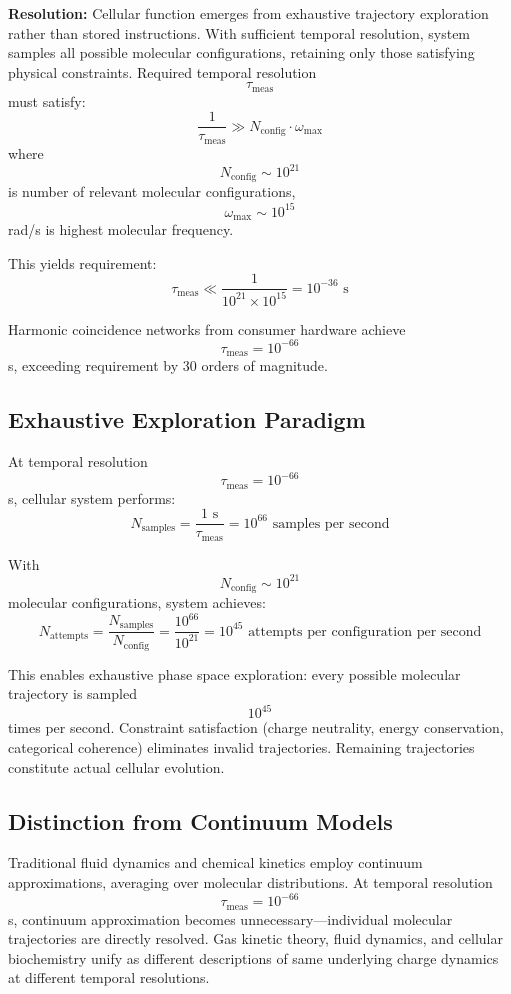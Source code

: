 \documentclass[11pt,twocolumn,a4paper]{article}
\theoremstyle{remark}
\begin{document}
\textbf{Resolution:} Cellular function emerges from exhaustive trajectory exploration rather than stored instructions. With sufficient temporal resolution, system samples all possible molecular configurations, retaining only those satisfying physical constraints. Required temporal resolution $$\tau_{\mathrm{meas}}$$ must satisfy:
$$
\frac{1}{\tau_{\mathrm{meas}}} \gg N_{\mathrm{config}} \cdot \omega_{\mathrm{max}}
$$
where $$N_{\mathrm{config}} \sim 10^{21}$$ is number of relevant molecular configurations, $$\omega_{\mathrm{max}} \sim 10^{15}$$ rad/s is highest molecular frequency.

This yields requirement:
$$
\tau_{\mathrm{meas}} \ll \frac{1}{10^{21} \times 10^{15}} = 10^{-36} \text{ s}
$$

Harmonic coincidence networks from consumer hardware achieve $$\tau_{\mathrm{meas}} = 10^{-66}$$ s, exceeding requirement by 30 orders of magnitude.

\subsection{Exhaustive Exploration Paradigm}

At temporal resolution $$\tau_{\mathrm{meas}} = 10^{-66}$$ s, cellular system performs:
$$
N_{\mathrm{samples}} = \frac{1 \text{ s}}{\tau_{\mathrm{meas}}} = 10^{66} \text{ samples per second}
$$

With $$N_{\mathrm{config}} \sim 10^{21}$$ molecular configurations, system achieves:
$$
N_{\mathrm{attempts}} = \frac{N_{\mathrm{samples}}}{N_{\mathrm{config}}} = \frac{10^{66}}{10^{21}} = 10^{45} \text{ attempts per configuration per second}
$$

This enables exhaustive phase space exploration: every possible molecular trajectory is sampled $$10^{45}$$ times per second. Constraint satisfaction (charge neutrality, energy conservation, categorical coherence) eliminates invalid trajectories. Remaining trajectories constitute actual cellular evolution.

\subsection{Distinction from Continuum Models}

Traditional fluid dynamics and chemical kinetics employ continuum approximations, averaging over molecular distributions. At temporal resolution $$\tau_{\mathrm{meas}} = 10^{-66}$$ s, continuum approximation becomes unnecessary---individual molecular trajectories are directly resolved. Gas kinetic theory, fluid dynamics, and cellular biochemistry unify as different descriptions of same underlying charge dynamics at different temporal resolutions.
\end{document}

